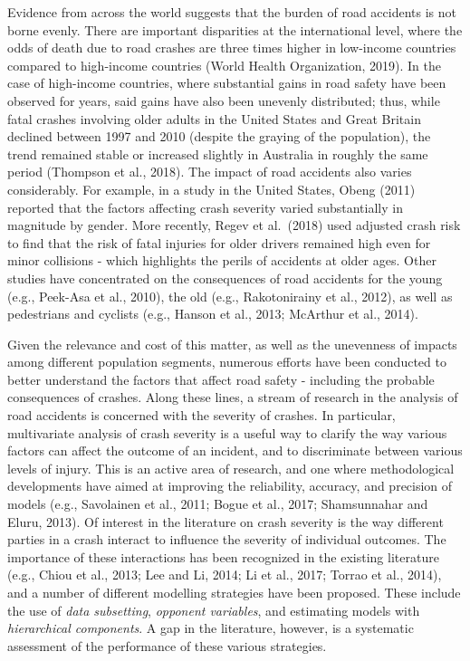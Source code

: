 \documentclass[]{elsarticle} %
\begin{document}
Evidence from across the world suggests that the burden of road
accidents is not borne evenly. There are important disparities at the
international level, where the odds of death due to road crashes are
three times higher in low-income countries compared to high-income
countries (World Health Organization, 2019). In the case of high-income
countries, where substantial gains in road safety have been observed for
years, said gains have also been unevenly distributed; thus, while fatal
crashes involving older adults in the United States and Great Britain
declined between 1997 and 2010 (despite the graying of the population),
the trend remained stable or increased slightly in Australia in roughly
the same period (Thompson et al., 2018). The impact of road accidents
also varies considerably. For example, in a study in the United States,
Obeng (2011) reported that the factors affecting crash severity varied
substantially in magnitude by gender. More recently, Regev et al.~(2018)
used adjusted crash risk to find that the risk of fatal injuries for
older drivers remained high even for minor collisions - which highlights
the perils of accidents at older ages. Other studies have concentrated
on the consequences of road accidents for the young (e.g., Peek-Asa et
al., 2010), the old (e.g., Rakotonirainy et al., 2012), as well as
pedestrians and cyclists (e.g., Hanson et al., 2013; McArthur et al.,
2014).

Given the relevance and cost of this matter, as well as the unevenness
of impacts among different population segments, numerous efforts have
been conducted to better understand the factors that affect road safety
- including the probable consequences of crashes. Along these lines, a
stream of research in the analysis of road accidents is concerned with
the severity of crashes. In particular, multivariate analysis of crash
severity is a useful way to clarify the way various factors can affect
the outcome of an incident, and to discriminate between various levels
of injury. This is an active area of research, and one where
methodological developments have aimed at improving the reliability,
accuracy, and precision of models (e.g., Savolainen et al., 2011; Bogue
et al., 2017; Shamsunnahar and Eluru, 2013). Of interest in the
literature on crash severity is the way different parties in a crash
interact to influence the severity of individual outcomes. The
importance of these interactions has been recognized in the existing
literature (e.g., Chiou et al., 2013; Lee and Li, 2014; Li et al., 2017;
Torrao et al., 2014), and a number of different modelling strategies
have been proposed. These include the use of \emph{data subsetting},
\emph{opponent variables}, and estimating models with \emph{hierarchical
components}. A gap in the literature, however, is a systematic
assessment of the performance of these various strategies.
\end{document}
